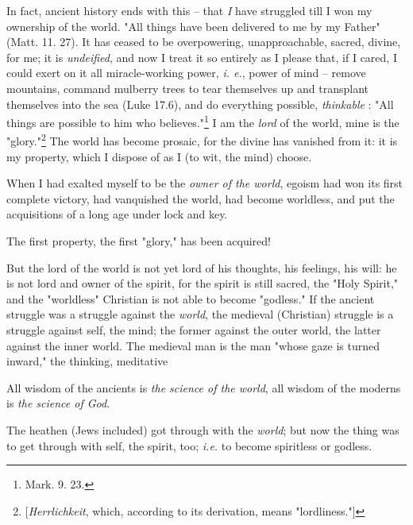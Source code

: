 In fact, ancient history ends with this -- that \textit{I} have struggled till 
I won my ownership of the world. "{}All things have been delivered to me by my 
Father"{} (Matt. 11. 27). It has ceased to be overpowering, unapproachable, 
sacred, divine, for me; it is \textit{undeified}, and now I treat it so 
entirely as I please that, if I cared, I could exert on it all miracle-working 
power, \textit{i. e.}, power of mind -- remove mountains, command mulberry 
trees to tear themselves up and transplant themselves into the sea (Luke 
17.6), and do everything possible, \textit{thinkable} : "{}All things are 
possible to him who believes."{}\footnote{Mark. 9. 23.} I am the \textit{lord} 
of the world, mine is the "{}glory."{}\footnote{[\textit{Herrlichkeit}, which, 
according to its derivation, means "{}lordliness."{}]} The world has become 
prosaic, for the divine has vanished from it: it is my property, which I 
dispose of as I (to wit, the mind) choose.

When I had exalted myself to be the \textit{owner of the world}, egoism had 
won its first complete victory, had vanquished the world, had become 
worldless, and put the acquisitions of a long age under lock and key.

The first property, the first "{}glory,"{} has been acquired!

But the lord of the world is not yet lord of his thoughts, his feelings, his 
will: he is not lord and owner of the spirit, for the spirit is still sacred, 
the "{}Holy Spirit,"{} and the "{}worldless"{} Christian is not able to become 
"{}godless."{} If the ancient struggle was a struggle against the 
\textit{world}, the medieval (Christian) struggle is a struggle against self, 
the mind; the former against the outer world, the latter against the inner 
world. The medieval man is the man "{}whose gaze is turned inward,"{} the 
thinking, meditative

All wisdom of the ancients is \textit{the science of the world}, all wisdom of 
the moderns is \textit{the science of God}.

The heathen (Jews included) got through with the \textit{world}; but now the 
thing was to get through with self, the spirit, too; \textit{i.e.} to become 
spiritless or godless.

